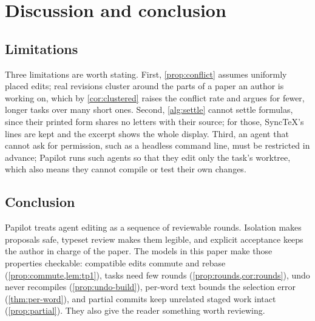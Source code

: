 \section{Discussion and conclusion}
\label{sec:conclusion}

\subsection{Limitations}

Three limitations are worth stating. First, \cref{prop:conflict} assumes
uniformly placed edits; real revisions cluster around the parts of a paper an
author is working on, which by \cref{cor:clustered} raises the conflict rate
and argues for fewer, longer tasks over many short ones. Second,
\cref{alg:settle} cannot settle formulas, since their printed form shares no
letters with their source; for those, SyncTeX's lines are kept and the excerpt
shows the whole display. Third, an agent that cannot ask for permission, such
as a headless command line, must be restricted in advance; Papilot runs such
agents so that they edit only the task's worktree, which also means they cannot
compile or test their own changes.

\subsection{Conclusion}

Papilot treats agent editing as a sequence of reviewable rounds. Isolation
makes proposals safe, typeset review makes them legible, and explicit
acceptance keeps the author in charge of the paper. The models in this paper
make those properties checkable: compatible edits commute and rebase
(\cref{prop:commute,lem:tp1}), tasks need few rounds
(\cref{prop:rounds,cor:rounds}), undo never recompiles
(\cref{prop:undo-build}), per-word text bounds the selection error
(\cref{thm:per-word}), and partial commits keep unrelated staged work intact
(\cref{prop:partial}). They also give the reader something worth reviewing.
